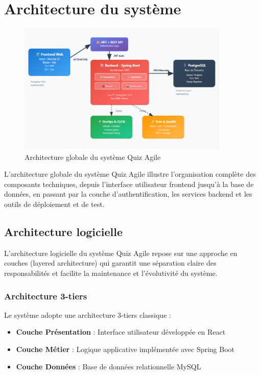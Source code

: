 \documentclass[12pt,a4paper]{report}
\begin{document}
\section{Architecture du système}

\begin{figure}[htbp]
    \centering
    \includegraphics[width=0.9\textwidth]{latex_media/media/Architecture_globale.png}
    \caption{Architecture globale du système Quiz Agile}
    \label{fig:architecture-globale}
\end{figure}

L'architecture globale du système Quiz Agile illustre l'organisation complète des composants techniques, depuis l'interface utilisateur frontend jusqu'à la base de données, en passant par la couche d'authentification, les services backend et les outils de déploiement et de test.

\subsection{Architecture logicielle}

L'architecture logicielle du système Quiz Agile repose sur une approche en couches (layered architecture) qui garantit une séparation claire des responsabilités et facilite la maintenance et l'évolutivité du système.

\subsubsection{Architecture 3-tiers}

Le système adopte une architecture 3-tiers classique :

\begin{itemize}
    \item \textbf{Couche Présentation} : Interface utilisateur développée en React
    \item \textbf{Couche Métier} : Logique applicative implémentée avec Spring Boot
    \item \textbf{Couche Données} : Base de données relationnelle MySQL
\end{itemize}
\end{document}
